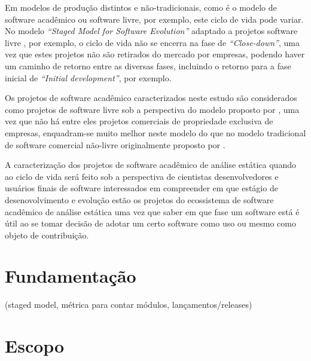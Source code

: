 Em modelos de produção distintos e não-tradicionais, como é o modelo de
software acadêmico ou software livre, por exemplo, este ciclo de vida pode
variar. No modelo {\it ``Staged Model for Software Evolution''} adaptado a
projetos software livre \cite{capiluppi2007adapting}, por exemplo, o ciclo de
vida não se encerra na fase de {\it ``Close-down''}, uma vez que estes projetos
não são retirados do mercado por empresas, podendo haver um caminho de retorno
entre as diversas fases, incluindo o retorno para a fase inicial de {\it
``Initial development''}, por exemplo.

Os projetos de software acadêmico caracterizados neste estudo são considerados
como projetos de software livre sob a perspectiva do modelo proposto por
, uma vez que não há entre eles projetos
comerciais de propriedade exclusiva de empresas, enquadram-se muito melhor
neste modelo do que no modelo tradicional de software comercial não-livre
originalmente proposto por .

A caracterização dos projetos de software acadêmico de análise estática quando
ao ciclo de vida será feito sob a perspectiva de cientistas desenvolvedores e
usuários finais de software interessados em compreender em que estágio de
desenovolvimento e evolução estão os projetos do ecossistema de software
acadêmico de análise estática uma vez que saber em que fase um software está é
útil ao se tomar decisão de adotar um certo software como uso ou mesmo como
objeto de contribuição.


\section{Fundamentação} \label{estudo3:fundamentacao}

(staged model, métrica para contar módulos, lançamentos/releases)

\section{Escopo} \label{estudo3:escopo} %


